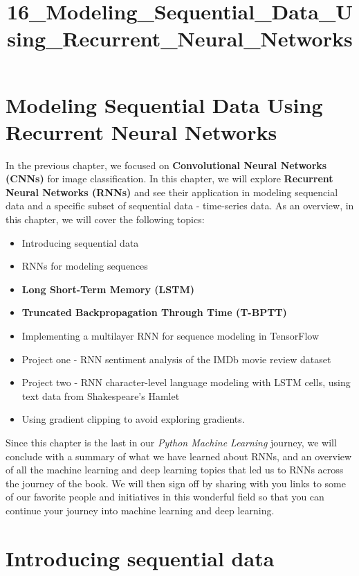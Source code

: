 \documentclass[11pt]{article}
\title{16\_Modeling\_Sequential\_Data\_Using\_Recurrent\_Neural\_Networks}
\providecommand{\tightlist}{%
      \setlength{\itemsep}{0pt}\setlength{\parskip}{0pt}}
\begin{document}
    
    
    \maketitle
    
    

    
    \section{Modeling Sequential Data Using Recurrent Neural
Networks}\label{modeling-sequential-data-using-recurrent-neural-networks}

    In the previous chapter, we focused on \textbf{Convolutional Neural
Networks (CNNs)} for image classification. In this chapter, we will
explore \textbf{Recurrent Neural Networks (RNNs)} and see their
application in modeling sequencial data and a specific subset of
sequential data - time-series data. As an overview, in this chapter, we
will cover the following topics:

\begin{itemize}
\tightlist
\item
  Introducing sequential data
\item
  RNNs for modeling sequences
\item
  \textbf{Long Short-Term Memory (LSTM)}
\item
  \textbf{Truncated Backpropagation Through Time (T-BPTT)}
\item
  Implementing a multilayer RNN for sequence modeling in TensorFlow
\item
  Project one - RNN sentiment analysis of the IMDb movie review dataset
\item
  Project two - RNN character-level language modeling with LSTM cells,
  using text data from Shakespeare's Hamlet
\item
  Using gradient clipping to avoid exploring gradients.
\end{itemize}

Since this chapter is the last in our \emph{Python Machine Learning}
journey, we will conclude with a summary of what we have learned about
RNNs, and an overview of all the machine learning and deep learning
topics that led us to RNNs across the journey of the book. We will then
sign off by sharing with you links to some of our favorite people and
initiatives in this wonderful field so that you can continue your
journey into machine learning and deep learning.

    \section{Introducing sequential data}\label{introducing-sequential-data}
\end{document}
